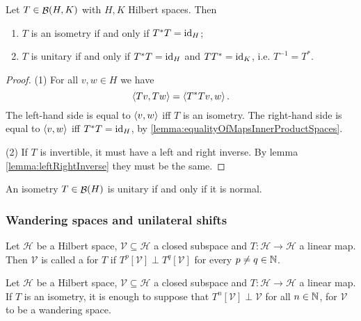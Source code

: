 \begin{proposition}
Let $T\in \mathop{\mathcal{B}}(H,K)$ with $H,K$ Hilbert spaces. Then
\begin{enumerate}
\item $T$ is an isometry \textup{if and only if} $T^*T = \operatorname{id}_H$;
\item $T$ is unitary \textup{if and only if} $T^*T = \operatorname{id}_H$ and $TT^* = \operatorname{id}_K$, i.e. $T^{-1} = T^*$.
\end{enumerate}
\end{proposition}
\begin{proof}
(1) For all $v,w\in H$ we have
\[ \left\langle Tv,Tw \right\rangle = \left\langle T^*Tv,w \right\rangle. \]
The left-hand side is equal to $\left\langle v,w \right\rangle$ iff $T$ is an isometry. The right-hand side is equal to $\left\langle v,w \right\rangle$ iff $T^*T = \operatorname{id}_H$, by \ref{lemma:equalityOfMapsInnerProductSpaces}.

(2) If $T$ is invertible, it must have a left and right inverse. By lemma \ref{lemma:leftRightInverse} they must be the same.
\end{proof}
\begin{corollary}
An isometry $T\in\mathop{\mathcal{B}}(H)$ is unitary \textup{if and only if} it is normal.
\end{corollary}

\subsubsection{Wandering spaces and unilateral shifts}
\begin{definition}
Let $\mathcal{H}$ be a Hilbert space, $\mathcal{V}\subseteq \mathcal{H}$ a closed subspace and $T:\mathcal{H}\to \mathcal{H}$ a linear map. Then $\mathcal{V}$ is called a  for $T$ if $T^p[\mathcal{V}]\perp T^q[\mathcal{V}]$ for every $p\neq q\in\mathbb{N}$.
\end{definition}
\begin{lemma}
Let $\mathcal{H}$ be a Hilbert space, $\mathcal{V}\subseteq \mathcal{H}$ a closed subspace and $T:\mathcal{H}\to \mathcal{H}$ a linear map.
If $T$ is an isometry, it is enough to suppose that $T^n[\mathcal{V}]\perp \mathcal{V}$ for all $n\in\mathbb{N}$, for $\mathcal{V}$ to be a wandering space.
\end{lemma}

